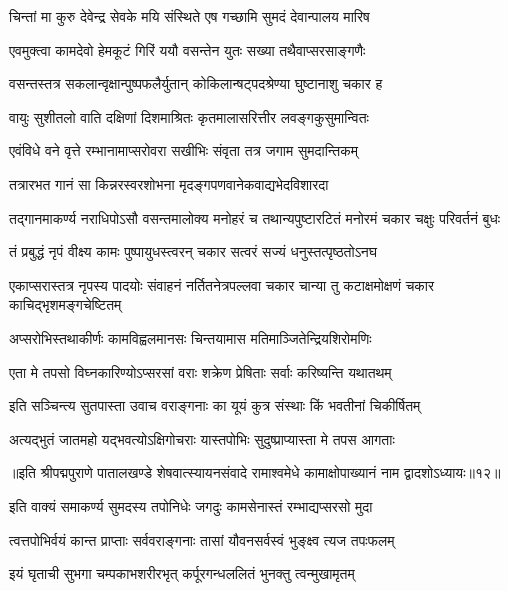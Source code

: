 \twolineshloka
{चिन्तां मा कुरु देवेन्द्र सेवके मयि संस्थिते}
{एष गच्छामि सुमदं देवान्पालय मारिष}%

\twolineshloka
{एवमुक्त्वा कामदेवो हेमकूटं गिरिं ययौ}
{वसन्तेन युतः सख्या तथैवाप्सरसाङ्गणैः}%

\twolineshloka
{वसन्तस्तत्र सकलान्वृक्षान्पुष्पफलैर्युतान्}
{कोकिलान्षट्पदश्रेण्या घुष्टानाशु चकार ह}%

\twolineshloka
{वायुः सुशीतलो वाति दक्षिणां दिशमाश्रितः}
{कृतमालासरित्तीर लवङ्गकुसुमान्वितः}%

\twolineshloka
{एवंविधे वने वृत्ते रम्भानामाप्सरोवरा}
{सखीभिः संवृता तत्र जगाम सुमदान्तिकम्}%

\twolineshloka
{तत्रारभत गानं सा किन्नरस्वरशोभना}
{मृदङ्गपणवानेकवाद्यभेदविशारदा}%

\fourlineindentedshloka
{तद्गानमाकर्ण्य नराधिपोऽसौ}
{वसन्तमालोक्य मनोहरं च}
{तथान्यपुष्टारटितं मनोरमं}
{चकार चक्षुः परिवर्तनं बुधः}%

\twolineshloka
{तं प्रबुद्धं नृपं वीक्ष्य कामः पुष्पायुधस्त्वरन्}
{चकार सत्वरं सज्यं धनुस्तत्पृष्ठतोऽनघ}%

\fourlineindentedshloka
{एकाप्सरास्तत्र नृपस्य पादयोः}
{संवाहनं नर्तितनेत्रपल्लवा}
{चकार चान्या तु कटाक्षमोक्षणं}
{चकार काचिद्भृशमङ्गचेष्टितम्}%

\twolineshloka
{अप्सरोभिस्तथाकीर्णः कामविह्वलमानसः}
{चिन्तयामास मतिमाञ्जितेन्द्रियशिरोमणिः}%

\twolineshloka
{एता मे तपसो विघ्नकारिण्योऽप्सरसां वराः}
{शक्रेण प्रेषिताः सर्वाः करिष्यन्ति यथातथम्}%

\twolineshloka
{इति सञ्चिन्त्य सुतपास्ता उवाच वराङ्गनाः}
{का यूयं कुत्र संस्थाः किं भवतीनां चिकीर्षितम्}%

\twolineshloka
{अत्यद्भुतं जातमहो यद्भवत्योऽक्षिगोचराः}
{यास्तपोभिः सुदुष्प्राप्यास्ता मे तपस आगताः}%

{॥इति श्रीपद्मपुराणे पातालखण्डे शेषवात्स्यायनसंवादे रामाश्वमेधे कामाक्षोपाख्यानं नाम द्वादशोऽध्यायः॥१२॥}



\twolineshloka
{इति वाक्यं समाकर्ण्य सुमदस्य तपोनिधेः}
{जगदुः कामसेनास्तं रम्भाद्यप्सरसो मुदा}%

\twolineshloka
{त्वत्तपोभिर्वयं कान्त प्राप्ताः सर्ववराङ्गनाः}
{तासां यौवनसर्वस्वं भुङ्क्ष्व त्यज तपःफलम्}%

\twolineshloka
{इयं घृताची सुभगा चम्पकाभशरीरभृत्}
{कर्पूरगन्धललितं भुनक्तु त्वन्मुखामृतम्}%


